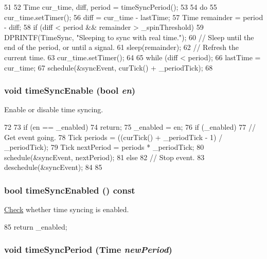 \begin{DoxyCode}
51 {
52     Time cur_time, diff, period = timeSyncPeriod();
53 
54     do {
55         cur_time.setTimer();
56         diff = cur_time - lastTime;
57         Time remainder = period - diff;
58         if (diff < period && remainder > _spinThreshold) {
59             DPRINTF(TimeSync, "Sleeping to sync with real time.\n");
60             // Sleep until the end of the period, or until a signal.
61             sleep(remainder);
62             // Refresh the current time.
63             cur_time.setTimer();
64         }
65     } while (diff < period);
66     lastTime = cur_time;
67     schedule(&syncEvent, curTick() + _periodTick);
68 }
\end{DoxyCode}
\hypertarget{classRoot_ad966d7a16083475060291e68ac9c9e24}{
\subsubsection[{timeSyncEnable}]{\setlength{\rightskip}{0pt plus 5cm}void timeSyncEnable (bool {\em en})}}
\label{classRoot_ad966d7a16083475060291e68ac9c9e24}


Enable or disable time syncing. 


\begin{DoxyCode}
72 {
73     if (en == _enabled)
74         return;
75     _enabled = en;
76     if (_enabled) {
77         // Get event going.
78         Tick periods = ((curTick() + _periodTick - 1) / _periodTick);
79         Tick nextPeriod = periods * _periodTick;
80         schedule(&syncEvent, nextPeriod);
81     } else {
82         // Stop event.
83         deschedule(&syncEvent);
84     }
85 }
\end{DoxyCode}
\hypertarget{classRoot_a7ca6e6b75b6eeb4aa20e46edce0ac6de}{
\subsubsection[{timeSyncEnabled}]{\setlength{\rightskip}{0pt plus 5cm}bool timeSyncEnabled () const}}
\label{classRoot_a7ca6e6b75b6eeb4aa20e46edce0ac6de}


\hyperlink{classCheck}{Check} whether time syncing is enabled. 


\begin{DoxyCode}
85 { return _enabled; }
\end{DoxyCode}
\hypertarget{classRoot_ac3f63e1a46d7fb3cc8d11ddbb148b65b}{
\subsubsection[{timeSyncPeriod}]{\setlength{\rightskip}{0pt plus 5cm}void timeSyncPeriod ({\bf Time} {\em newPeriod})}}
\label{classRoot_ac3f63e1a46d7fb3cc8d11ddbb148b65b}


